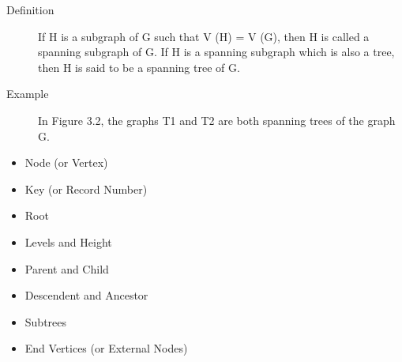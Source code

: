 \documentclass[]{report}
\begin{document}
\begin{description}
\item[Definition]  If H is a subgraph of G such that V (H) = V (G), then H
is called a spanning subgraph of G. If H is a spanning subgraph
which is also a tree, then H is said to be a spanning tree of G.

\item[Example] In Figure 3.2, the graphs T1 and T2 are both spanning
trees of the graph G.
\end{description}
\begin{itemize}
\item Node (or Vertex)
\item Key (or Record Number)
\item Root
\item Levels and Height
\item Parent and Child
\item Descendent and Ancestor
\item Subtrees
\item End Vertices (or External Nodes)
\end{itemize}
\end{document}
